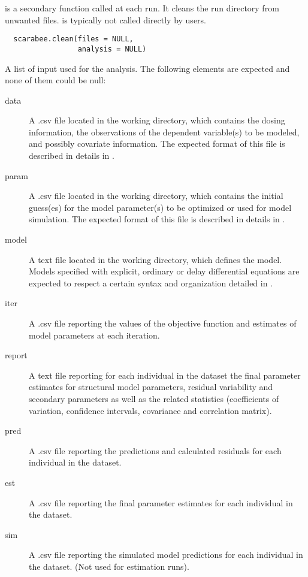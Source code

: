 %
\begin{Description}\relax
{} is a secondary function called at each  
run. It cleans the run directory from unwanted files.  
is typically not called directly by users.
\end{Description}
%
\begin{Usage}
\begin{verbatim}
  scarabee.clean(files = NULL,
                 analysis = NULL)
\end{verbatim}
\end{Usage}
%
\begin{Arguments}
\begin{ldescription}
\item[\code{files}] A list of input used for the analysis. The following elements are
expected and none of them could be null: \begin{description}

\item[data] A .csv file located in the working directory, which contains
the dosing information, the observations of the dependent variable(s)
to be modeled, and possibly covariate information. The expected format 
of this file is described in details in .
\item[param] A .csv file located in the working directory, which contains
the initial guess(es) for the model parameter(s) to be optimized or used
for model simulation. The expected format of this file is described in
details in .
\item[model] A text file located in the working directory, which defines 
the model. Models specified with explicit, ordinary or delay 
differential equations are expected to respect a certain syntax and 
organization detailed in .
\item[iter] A .csv file reporting the values of the objective function
and estimates of model parameters at each iteration.
\item[report] A text file reporting for each individual in the dataset the
final parameter estimates for structural model parameters, residual 
variability and secondary parameters as well as the related statistics 
(coefficients of variation, confidence intervals, covariance and 
correlation matrix).
\item[pred] A .csv file reporting the predictions and calculated residuals
for each individual in the dataset.
\item[est] A .csv file reporting the final parameter estimates for each
individual in the dataset.
\item[sim] A .csv file reporting the simulated model predictions for each 
individual in the dataset. (Not used for estimation runs).


\end{description}
\end{ldescription}
\end{Arguments}

